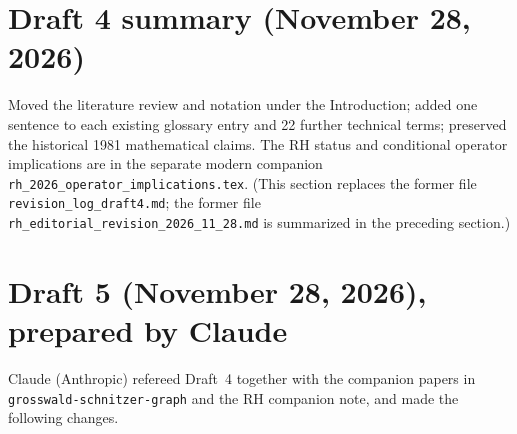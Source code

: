 \documentclass[12pt,letterpaper]{article}
\begin{document}
\section{Draft 4 summary (November 28, 2026)}
Moved the literature review and notation under the Introduction; added
one sentence to each existing glossary entry and 22 further technical
terms; preserved the historical 1981 mathematical claims.  The RH status
and conditional operator implications are in the separate modern
companion \nolinkurl{rh_2026_operator_implications.tex}.  (This section
replaces the former file \nolinkurl{revision_log_draft4.md}; the former
file \nolinkurl{rh_editorial_revision_2026_11_28.md} is summarized in the
preceding section.)

\section{Draft 5 (November 28, 2026), prepared by Claude}
Claude (Anthropic) refereed Draft~4 together with the companion papers
in \texttt{grosswald-schnitzer-graph} and the RH companion note, and
made the following changes.
\end{document}
